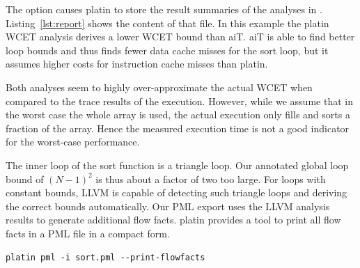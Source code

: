 

The  option causes platin to store the result summaries of the analyses in
. Listing~\ref{lst:report} shows the content of that file.
In this example the platin WCET analysis derives a lower WCET bound than aiT.
aiT is able to find better loop bounds and thus finds
fewer data cache misses for the sort loop, but it assumes higher costs for instruction cache misses than platin.


Both analyses seem to highly over-approximate the actual WCET when compared to the trace results of the
execution. However, while we assume that in the worst case the whole array is used, the actual execution only fills and sorts a fraction of the array.
Hence the measured execution time is not a good indicator for the worst-case performance.

The inner loop of the sort function is a triangle loop. Our annotated global loop bound of $(N-1)^2$ is thus about a
factor of two too large. For loops with constant bounds, LLVM is capable of
detecting such triangle loops and deriving the correct bounds automatically.
Our PML export uses the LLVM analysis results to generate additional flow facts.
platin provides a tool to print all flow facts in a PML file in a compact form.

\begin{verbatim}
platin pml -i sort.pml --print-flowfacts
\end{verbatim}

